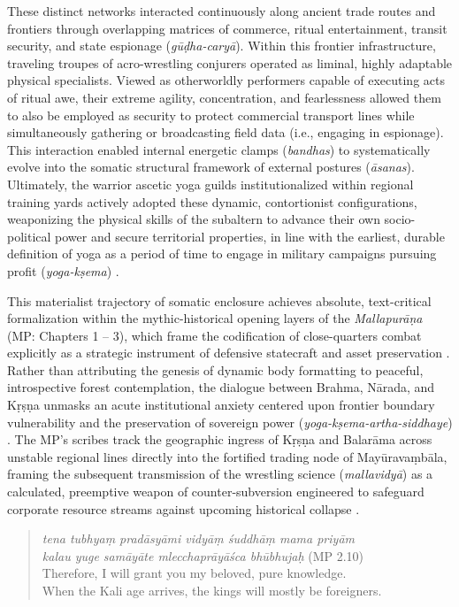 \documentclass[11pt,twoside,letterpaper]{article}
\begin{document}
These distinct networks interacted continuously along ancient trade routes and frontiers through overlapping matrices of commerce, ritual entertainment, transit security, and state espionage (\textit{gūḍha-caryā}). Within this frontier infrastructure, traveling troupes of acro-wrestling conjurers operated as liminal, highly adaptable physical specialists. Viewed as otherworldly performers capable of executing acts of ritual awe, their extreme agility, concentration, and fearlessness allowed them to also be employed as security to protect commercial transport lines while simultaneously gathering or broadcasting field data (i.e., engaging in espionage). This interaction enabled internal energetic clamps (\textit{bandhas}) to systematically evolve into the somatic structural framework of external postures (\textit{āsanas}). Ultimately, the warrior ascetic yoga guilds institutionalized within regional training yards actively adopted these dynamic, contortionist configurations, weaponizing the physical skills of the subaltern to advance their own socio-political power and secure territorial properties, in line with the earliest, durable definition of yoga as a period of time to engage in military campaigns pursuing profit (\textit{yoga-kṣema}) \citep{oberlies2024,gwilt2024}.

This materialist trajectory of somatic enclosure achieves absolute, text-critical formalization within the mythic-historical opening layers of the \textit{Mallapurāṇa} (MP: Chapters 1 -- 3), which frame the codification of close-quarters combat explicitly as a strategic instrument of defensive statecraft and asset preservation \citep{MP_7}. Rather than attributing the genesis of dynamic body formatting to peaceful, introspective forest contemplation, the dialogue between Brahma, Nārada, and Kṛṣṇa unmasks an acute institutional anxiety centered upon frontier boundary vulnerability and the preservation of sovereign power (\textit{yoga-kṣema-artha-siddhaye}) \citep{MP_7}. The MP's scribes track the geographic ingress of Kṛṣṇa and Balarāma across unstable regional lines directly into the fortified trading node of Mayūravaṃbāla, framing the subsequent transmission of the wrestling science (\textit{mallavidyā}) as a calculated, preemptive weapon of counter-subversion engineered to safeguard corporate resource streams against upcoming historical collapse \citep{MP_7, russell2025, rochard2023,  soral2025}.

\begin{quote}
\textit{tena tubhyaṃ pradāsyāmi vidyāṃ śuddhāṃ mama priyām } \\
\textit{kalau yuge samāyāte mlecchaprāyāśca bhūbhujaḥ} (MP 2.10)  \\
Therefore, I will grant you my beloved, pure knowledge. \\
When the Kali age arrives, the kings will mostly be foreigners. \\
\end{quote}
\end{document}
